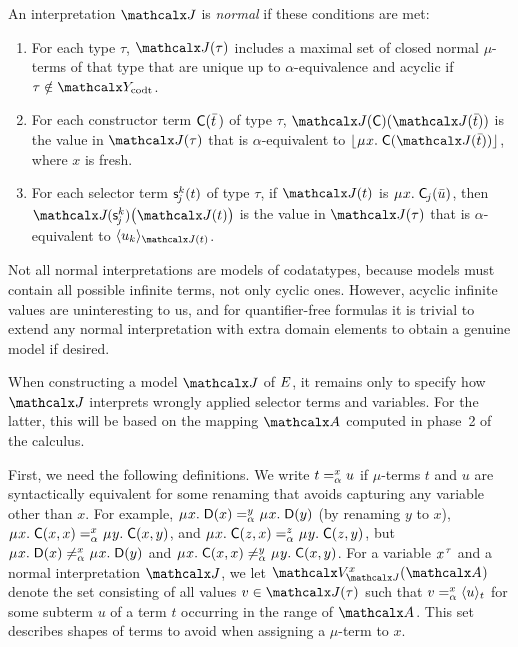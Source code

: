 \begin{definition}
\afterDot%
\label{def:norm-interpretation}%
\rm
An interpretation $\J$ is \emph{normal} if these conditions are met:
\begin{enumerate}
\item
For each type $\tau$,
$\interp{\J}{\tau}$ includes a maximal set of closed normal $\mu$-terms of that type that are
unique up to $\alpha$-equivalence and acyclic if $\tau \notin \Codata$.
\item
For each constructor term $\const{C}( \vec t \,)$ of type $\tau$,
$\interp{\J}{\const{C}}( \interp{\J}{\vec t} )$ is the value
in $\interp{\J}{\tau}$ that is $\alpha$-equivalent to
$\nf{\MU x.\; \const{C}( \interp{\J}{\vec t} )}$, where $x$ is fresh.
\item
For each selector term $\const s^k_{\negvthinspace j}( t )$ of type $\tau$, %
if $\interp{\J}{t}$ is $\MU x.\; \const{C}_{\negvthinspace j}( \vec u )$,
then $\J\negvvthinspace( \const s^k_{\negvthinspace j} )\bigl( \interp{\J}{t} \bigr)$ is the value
in $\interp{\J}{\tau}$ that is $\alpha$-equivalent to
$\expand{\interp{\J}{t}}{u_k}$.
\end{enumerate}
\end{definition}

Not all normal interpretations are models of codatatypes, because
models must contain all possible infinite terms, not only cyclic ones. However,
acyclic infinite values are uninteresting to us, and for quantifier-free
formulas it is trivial to extend any normal interpretation with extra
domain elements to obtain a genuine model if desired. %

When constructing a model $\J$ of $\Ec$,
it remains only to specify how $\J$ interprets wrongly applied selector terms and variables.
For the latter, this will be based on the mapping $\Val$ computed in phase~2 of the calculus.

{
First, we need the following definitions.
We write $t \vsimv{x} u$ if $\mu$-terms $t$ and $u$ are syntactically equivalent
for some renaming that avoids capturing any variable other than $x$.
For example,
$\MU x.\; \const{D}( x ) \vsimv{y} \MU x.\; \const{D}( y )$
(by renaming $y$ to $x$),
$\MU x.\; \const{C}( x, x ) \vsimv{x} \MU y.\; \const{C}( x, y )$, and
$\MU x.\; \const{C}( z, x ) \vsimv{z} \MU y.\; \const{C}( z, y )$,
but
$\MU x.\; \const{D}( x ) \not\vsimv{x} \MU x.\; \const{D}( y )$ and
$\MU x.\; \const{C}( x, x ) \not\vsimv{y} \MU y.\; \const{C}( x, y )$.
For a variable $x\typ{\tau}$ and a normal interpretation $\J$,
we let $\BAD_{\smash{\J}}^x( \Val )$ denote the set consisting of all values
$v \in \interp{\J}{\tau}$
such that $v \vsimv{x} \expand{t}{u}$ for some subterm $u$ of a term $t$
occurring in the range of $\Val$. This set describes shapes of terms to avoid
when assigning a $\mu$-term to $x$.

}

